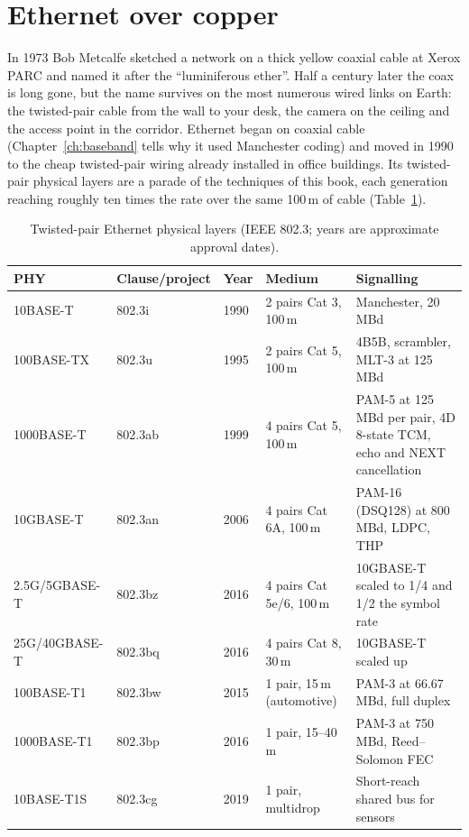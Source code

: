 \section{Ethernet over copper}
\label{sec:ch24:ethernet}

In 1973 Bob Metcalfe sketched a network on a thick yellow coaxial cable at Xerox PARC and named it
after the ``luminiferous ether''. Half a century later the coax is long gone, but the name survives
on the most numerous wired links on Earth: the twisted-pair cable from the wall to your desk, the
camera on the ceiling and the access point in the corridor. Ethernet began on coaxial cable
(Chapter~\ref{ch:baseband} tells why it used Manchester coding) and moved in 1990 to the cheap
twisted-pair wiring already installed in office buildings. Its twisted-pair physical layers are a
parade of the techniques of this book, each generation reaching roughly ten times the rate over the
same 100\,m of cable (Table~\ref{tab:ch24:ethernet}).

\begin{table}[htbp]\centering\small
\caption{Twisted-pair Ethernet physical layers (IEEE 802.3; years are approximate approval dates).}
\label{tab:ch24:ethernet}
\begin{tabularx}{\linewidth}{@{}l l l l X@{}}
\toprule
PHY & Clause/project & Year & Medium & Signalling\\
\midrule
10BASE-T & 802.3i & 1990 & 2 pairs Cat 3, 100\,m & Manchester, 20\,MBd\\
100BASE-TX & 802.3u & 1995 & 2 pairs Cat 5, 100\,m & 4B5B, scrambler, MLT-3 at 125\,MBd\\
1000BASE-T & 802.3ab & 1999 & 4 pairs Cat 5, 100\,m & PAM-5 at 125\,MBd per pair, 4D 8-state TCM, echo and NEXT cancellation\\
10GBASE-T & 802.3an & 2006 & 4 pairs Cat 6A, 100\,m & PAM-16 (DSQ128) at 800\,MBd, LDPC, THP\\
2.5G/5GBASE-T & 802.3bz & 2016 & 4 pairs Cat 5e/6, 100\,m & 10GBASE-T scaled to 1/4 and 1/2 the symbol rate\\
25G/40GBASE-T & 802.3bq & 2016 & 4 pairs Cat 8, 30\,m & 10GBASE-T scaled up\\
100BASE-T1 & 802.3bw & 2015 & 1 pair, 15\,m (automotive) & PAM-3 at 66.67\,MBd, full duplex\\
1000BASE-T1 & 802.3bp & 2016 & 1 pair, 15--40\,m & PAM-3 at 750\,MBd, Reed--Solomon FEC\\
10BASE-T1S & 802.3cg & 2019 & 1 pair, multidrop & Short-reach shared bus for sensors\\
\bottomrule
\end{tabularx}
\end{table}

